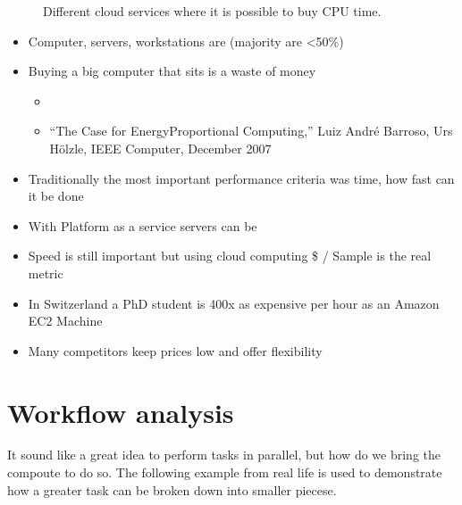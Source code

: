 \documentclass[letterpaper,10pt,english]{sphinxmanual}
\begin{document}
\begin{figure}[htbp]
\centering
\capstart

\noindent{}
\caption{Different cloud services where it is possible to buy CPU time.}\label{\detokenize{01-Introduction:id27}}\end{figure}
\begin{itemize}
\item {} 
\sphinxAtStartPar
Computer, servers, workstations are  (majority are \textless{}50\%)

\item {} 
\sphinxAtStartPar
Buying a big computer that sits  is a waste of money
\begin{itemize}
\item {} 
\sphinxAtStartPar
{}

\item {} 
\sphinxAtStartPar
“The Case for Energy\sphinxhyphen{}Proportional Computing,” Luiz André Barroso, Urs Hölzle, IEEE Computer, December 2007

\end{itemize}

\item {} 
\sphinxAtStartPar
Traditionally the most important performance criteria was time, how fast can it be done

\item {} 
\sphinxAtStartPar
With Platform as a service servers can be 

\item {} 
\sphinxAtStartPar
Speed is still important but using cloud computing \$ / Sample is the real metric

\item {} 
\sphinxAtStartPar
In Switzerland a PhD student is 400x as expensive per hour as an Amazon EC2 Machine

\item {} 
\sphinxAtStartPar
Many competitors keep prices low and offer flexibility

\end{itemize}




\section{Workflow analysis}
\label{\detokenize{01-Introduction:workflow-analysis}}
\sphinxAtStartPar
It sound like a great idea to perform tasks in parallel, but how do we bring the compoute to do so. The following example from real life is used to demonstrate how a greater task can be broken down into smaller piecese.
\end{document}
